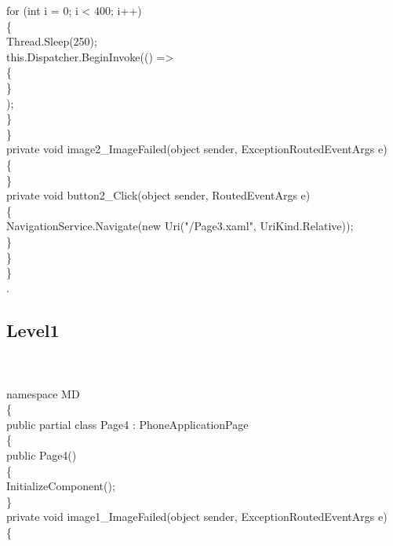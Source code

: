 {{            for (int i = 0; i < 400; i++)\\
            \{\\
                Thread.Sleep(250);\\
                

                this.Dispatcher.BeginInvoke(() =>\\
                \{\\
                                            

                \}\\);\\
            \}\\
            
        \}\\

        private void image2_ImageFailed(object sender, ExceptionRoutedEventArgs e)\\
        \{\\

        \}\\

        private void button2_Click(object sender, RoutedEventArgs e)\\
        \{\\
            NavigationService.Navigate(new Uri("/Page3.xaml", UriKind.Relative));\\
        \}\\

        
    \}\\
\}\\
\cite{DBLP:journals/ivc/KadyrovP03}.\\
\rmfamily



\subsection{Level1}\\
\ttfamily \hspace{1cm}\\


namespace MD\\
\{\\
    public partial class Page4 : PhoneApplicationPage\\
    \{\\
        public Page4()\\
        \{\\
            InitializeComponent();\\
        \}\\
        private void image1_ImageFailed(object sender, ExceptionRoutedEventArgs e)\\
        \{\\

}}
